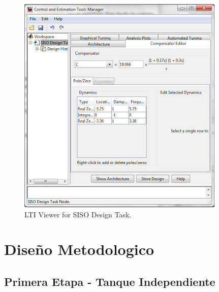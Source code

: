 \documentclass[a4paper,12pt,twoside]{proyectotanquesecci}
\begin{document}
\begin{figure}[h]
\centering
\includegraphics[scale=0.7]{Ventana18}
\renewcommand{\figurename}{Fig.}
\caption{LTI Viewer for SISO Design Task.}
\label{LTI Viewer for SISO Design Task.}
\end{figure}

\newpage






\chapter{Diseño Metodologico}





\section{Primera Etapa - Tanque Independiente}
\end{document}
